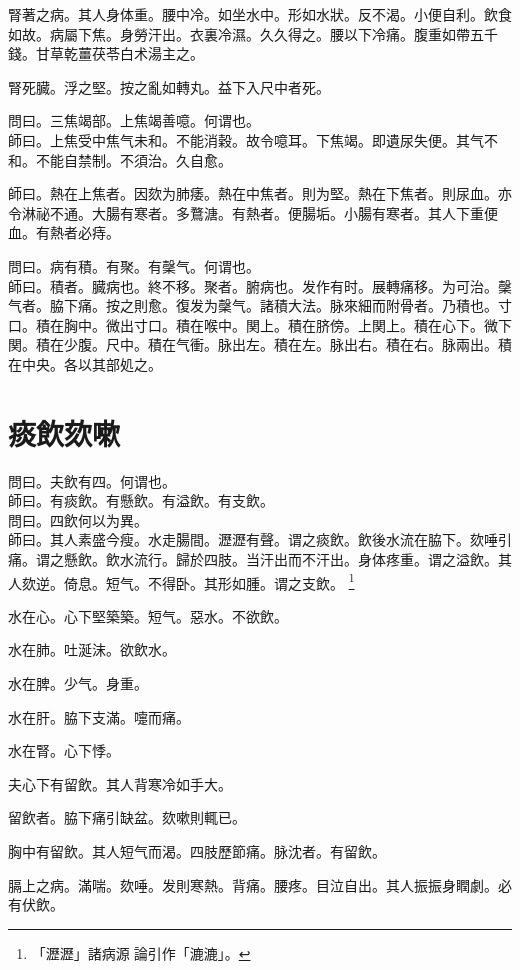 腎著之病。其人身体重。腰中冷。如坐水中。形如水狀。反不渴。小便自利。飲食如故。病屬下焦。身勞汗出。衣裏冷濕。久久得之。腰以下冷痛。腹重如帶五千錢。甘{\khaaitp 草乾}薑{\khaaitp 茯}苓{\khaaitp 白}术湯主之。

腎死臓。浮之堅。按之亂如轉丸。益下入尺中者死。

問曰。三焦竭部。上焦竭善噫。何谓也。\\
師曰。上焦受中焦气未和。不能消穀。故令噫耳。下焦竭。即遺尿失便。其气不和。不能自禁制。不須治。久自愈。

師曰。熱在上焦者。因欬为肺痿。熱在中焦者。則为堅。熱在下焦者。則尿血。亦令淋祕不通。大腸有寒者。多鶩溏。有熱者。便腸垢。小腸有寒者。其人下重便血。有熱者必痔。

問曰。病有積。有聚。有䅽气。何谓也。\\
師曰。積者。臓病也。終不移。聚者。腑病也。发作有时。展轉痛移。为可治。䅽气者。脇下痛。按之則愈。復发为䅽气。諸積大法。脉來細而附骨者。乃積也。寸口。積在胸中。微出寸口。積在喉中。関上。積在脐傍。上関上。積在心下。微下関。積在少腹。尺中。積在气衝。脉出左。積在左。脉出右。積在右。脉兩出。積在中央。各以其部処之。

\chapter{痰飲欬嗽}

問曰。夫飲有四。何谓也。\\
師曰。有痰飲。有懸飲。有溢飲。有支飲。\\
問曰。四飲何以为異。\\
師曰。其人素盛今瘦。水走腸間。瀝瀝有聲。谓之痰飲。飲後水流在脇下。欬唾引痛。谓之懸飲。飲水流行。歸於四肢。当汗出而不汗出。身体疼重。谓之溢飲。其人欬逆。倚息。短气。不得卧。其形如腫。谓之支飲。
	\footnote{
		「瀝瀝」諸病源{\sungtpii 𠊱}論引作「漉漉」。
	}

水在心。心下堅築{\khaaitp 築}。短气。惡水。不欲飲。

水在肺。吐涎沫。欲飲水。

水在脾。少气。身重。

水在肝。脇下支滿。嚏而痛。

水在腎。心下悸。

夫心下有留飲。其人背寒冷如手大。

留飲者。脇下痛引缺盆。欬嗽則輒已。

胸中有留飲。其人短气而渴。四肢歷節痛。脉沈者。有留飲。

膈上之病。滿喘。欬唾。发則寒熱。背痛。腰疼。目泣自出。其人振振身瞤劇。必有伏飲。{\wuben}

